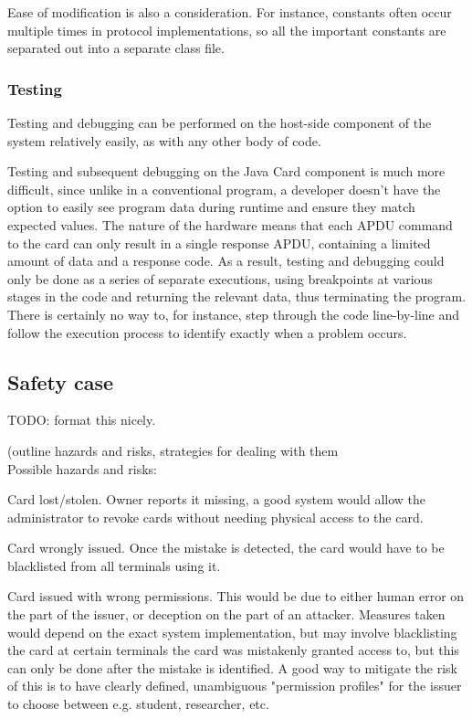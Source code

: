 \documentclass[12pt]{article}
\begin{document}
Ease of modification is also a consideration. For instance, constants often occur multiple times in protocol implementations, so all the important constants are separated out into a separate class file.

\subsubsection{Testing}
\label{subsec:testing}

Testing and debugging can be performed on the host-side component of the system relatively easily, as with any other body of code.

Testing and subsequent debugging on the Java Card component is much more difficult, since unlike in a conventional program, a developer doesn't have the option to easily see program data during runtime and ensure they match expected values. The nature of the hardware means that each APDU command to the card can only result in a single response APDU, containing a limited amount of data and a response code. As a result, testing and debugging could only be done as a series of separate executions, using breakpoints at various stages in the code and returning the relevant data, thus terminating the program. There is certainly no way to, for instance, step through the code line-by-line and follow the execution process to identify exactly when a problem occurs. %




\subsection{Safety case}
TODO: format this nicely.

(outline hazards and risks, strategies for dealing with them\\
Possible hazards and risks:

Card lost/stolen. Owner reports it missing, a good system would allow the administrator to revoke cards without needing physical access to the card.

Card wrongly issued. Once the mistake is detected, the card would have to be blacklisted from all terminals using it.

Card issued with wrong permissions. This would be due to either human error on the part of the issuer, or deception on the part of an attacker. Measures taken would depend on the exact system implementation, but may involve blacklisting the card at certain terminals the card was mistakenly granted access to, but this can only be done after the mistake is identified. A good way to mitigate the risk of this is to have clearly defined, unambiguous "permission profiles" for the issuer to choose between e.g. student, researcher, etc.
\end{document}
